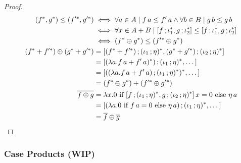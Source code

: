 \documentclass[runningheads,envcountsame]{llncs}
\begin{document}
\begin{proof}
    \begin{align}
        (f^*, g^*) \leq (f'^*, g'^*) &\iff \forall a \in A \mid f\,a \leq f'\,a \wedge \forall b \in B \mid g\,b \leq g\,b \\
            &\iff \forall x \in A + B \mid [\comp{f}{\iota_1^*}, \comp{g}{\iota_2^*}] \leq [\comp{f}{\iota_1^*}, \comp{g}{\iota_2^*}] \\
            &\iff (f^* \oplus g^*) \leq (f'^* \oplus g^*) \\
        (f^* + f'^*) \oplus (g^* + g'^*) &= [\comp{(f^* + f'^*)}{(\comp{\iota_1}{\munit})^*}, \comp{(g^* + g'^*)}{(\comp{\iota_2}{\munit})^*}] \\
            & = [\comp{(\lambda a. f\,a + f'\,a)^*)}{(\comp{\iota_1}{\munit})^*}, \dots] \\
            & = [(\comp{(\lambda a. f\,a + f'\,a)}{(\comp{\iota_1}{\munit})^*})^*, \dots] \\
            & = (f^* \oplus g^*) + (f'^* \oplus g'^*) \\
        \overline{f \oplus g} &= \lambda x. 0 \text{ if } [\comp{f}{(\comp{\iota_1}{\munit})^*}, \comp{g}{(\comp{\iota_2}{\munit})^*}]\,x = 0 \text{ else } \munit\,a \\
            &= [\comp{(\lambda a. 0 \text{ if } f\,a = 0 \text{ else } \munit\,a)}{(\comp{\iota_1}{\munit})^*}, \dots] \\
            &= \overline{f} \oplus \overline{g}
    \end{align}
\end{proof}

\subsubsection{Case Products (WIP)}
\end{document}
